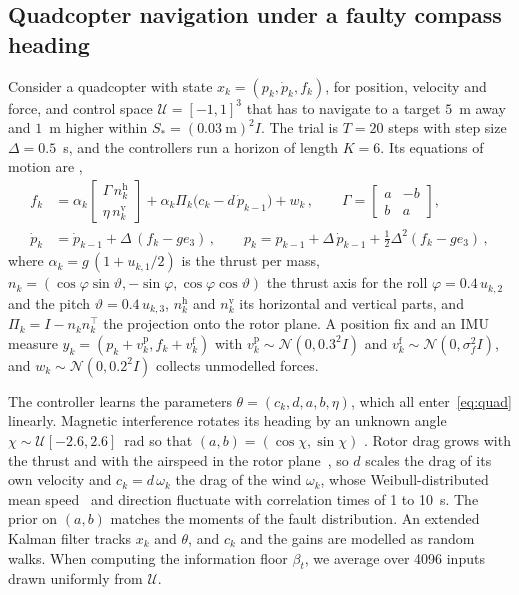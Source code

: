 \documentclass{l4dc2027}
\def\cN{\mathcal{N}}
\def\cU{\mathcal{U}}
\begin{document}
\subsection{Quadcopter navigation under a faulty compass heading} \label{sec:quadcopter}

Consider a quadcopter with state $x_k = (p_k, \dot p_k, f_k)$, for position, velocity and force, and control space $\mathcal{U} = [-1, 1]^3$ that has to navigate to a target $5$~m away and $1$~m higher within $S_* = (0.03~\mathrm{m})^2 I$. The trial is $T = 20$ steps with step size $\Delta = 0.5$~s, and the controllers run a horizon of length $K = 6$. Its equations of motion are \citep{mahony2012multirotor},
\begin{equation}\label{eq:quad}
\begin{aligned}
	f_k &= \alpha_k \begin{bmatrix} \Gamma\, n^{\mathrm{h}}_k \\ \eta\, n^{\mathrm{v}}_k \end{bmatrix} + \alpha_k \Pi_k \big( c_k - d\, \dot p_{k-1} \big) + w_k \, , \qquad \Gamma = \begin{bmatrix} a & -b \\ b & a \end{bmatrix} , \\
	\dot p_k &= \dot p_{k-1} + \Delta\, (f_k - g e_3) \, , \qquad p_k = p_{k-1} + \Delta\, \dot p_{k-1} + \tfrac{1}{2}\Delta^2 (f_k - g e_3) \, ,
\end{aligned}
\end{equation}
where $\alpha_k = g\,(1 + u_{k,1}/2)$ is the thrust per mass, $n_k = (\cos\varphi \sin\vartheta, -\sin\varphi, \cos\varphi\cos\vartheta)$ the thrust axis for the roll $\varphi = 0.4\, u_{k,2}$ and the pitch $\vartheta = 0.4\, u_{k,3}$, $n^{\mathrm{h}}_k$ and $n^{\mathrm{v}}_k$ its horizontal and vertical parts, and $\Pi_k = I - n_k n_k^\top$ the projection onto the rotor plane. A position fix and an IMU measure $y_k = (p_k + v^{\mathrm{p}}_k, f_k + v^{\mathrm{f}}_k)$ with $v^{\mathrm{p}}_k \sim \cN(0, 0.3^2 I)$ and $v^{\mathrm{f}}_k \sim \cN(0, \sigma_f^2 I)$, and $w_k \sim \cN(0, 0.2^2 I)$ collects unmodelled forces.

The controller learns the parameters $\theta = (c_k, d, a, b, \eta)$, which all enter~\eqref{eq:quad} linearly. Magnetic interference rotates its heading by an unknown angle $\chi \sim \mathcal{U}[-2.6, 2.6]$~rad so that $(a, b) = (\cos\chi, \sin\chi)$ \citep{kok2016magnetometer}. Rotor drag grows with the thrust and with the airspeed in the rotor plane~\citep{martin2010true,kai2017nonlinear,faessler2017differential}, so $d$ scales the drag of its own velocity and $c_k = d\,\omega_k$ the drag of the wind $\omega_k$, whose Weibull-distributed mean speed~\citep{justus1978methods} and direction fluctuate with correlation times of 1 to 10~s. The prior on $(a, b)$ matches the moments of the fault distribution. An extended Kalman filter tracks $x_k$ and $\theta$, and $c_k$ and the gains are modelled as random walks. 
When computing the information floor $\beta_t$, we average over 4096 inputs drawn uniformly from $\cU$.
\end{document}

